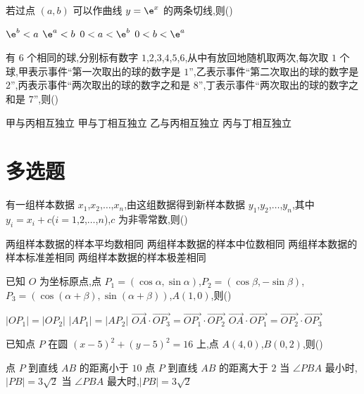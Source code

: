 \begin{problem}
若过点 \((a,b)\) 可以作曲线 \(y=\e^x\) 的两条切线,则(\quad)

\choices
    {\(\e^b<a\)}
    {\(\e^a<b\)}
    {\(0<a<\e^b\)}
    {\(0<b<\e^a\)}
\end{problem}

\begin{problem}
有 \(6\) 个相同的球,分别标有数字 \(1\),\(2\),\(3\),\(4\),\(5\),\(6\),从中有放回地随机取两次,每次取 \(1\) 个球,甲表示事件``第一次取出的球的数字是 \(1\)'',乙表示事件``第二次取出的球的数字是 \(2\)'',丙表示事件``两次取出的球的数字之和是 \(8\)'',丁表示事件``两次取出的球的数字之和是 \(7\)'',则(\quad)

\choices
    {甲与丙相互独立}
    {甲与丁相互独立}
    {乙与丙相互独立}
    {丙与丁相互独立}
\end{problem}

\section{多选题}

\begin{problem}
有一组样本数据 \(x_1\),\(x_2\),\(\dots\),\(x_n\),由这组数据得到新样本数据 \(y_1\),\(y_2\),\(\dots\),\(y_n\),其中 \(y_i=x_i+c\)(\(i=1\),\(2\),\(\dots\),\(n\)),\(c\) 为非零常数,则(\quad)

\choices
    {两组样本数据的样本平均数相同}
    {两组样本数据的样本中位数相同}
    {两组样本数据的样本标准差相同}
    {两组样本数据的样本极差相同}
\end{problem}

\begin{problem}
已知 \(O\) 为坐标原点,点 \(P_1=\left( \cos\alpha,\sin\alpha \right)\),\(P_2=\left( \cos\beta,-\sin\beta \right)\),\(P_3=\left( \cos\left( \alpha+\beta \right),\sin\left( \alpha+\beta \right) \right)\),\(A(1,0)\),则(\quad)

\choices
    {\(|OP_1|=|OP_2|\)}
    {\(|AP_1|=|AP_2|\)}
    {\(\overrightarrow{OA}\cdot\overrightarrow{OP_3}=\overrightarrow{OP_1}\cdot\overrightarrow{OP_2}\)}
    {\(\overrightarrow{OA}\cdot\overrightarrow{OP_1}=\overrightarrow{OP_2}\cdot\overrightarrow{OP_3}\)}
\end{problem}

\begin{problem}
已知点 \(P\) 在圆 \(\left( x-5 \right)^2+\left( y-5 \right)^2=16\) 上,点 \(A(4,0)\),\(B(0,2)\),则(\quad)

\choices
    {点 \(P\) 到直线 \(AB\) 的距离小于 \(10\)}
    {点 \(P\) 到直线 \(AB\) 的距离大于 \(2\)}
    {当 \(\angle PBA\) 最小时,\(|PB|=3\sqrt{2}\)}
    {当 \(\angle PBA\) 最大时,\(|PB|=3\sqrt{2}\)}
\end{problem}

